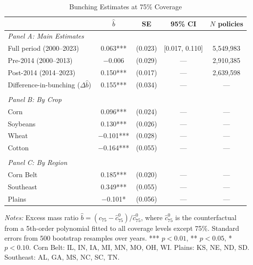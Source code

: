 \begin{table}[htbp]
\centering
\caption{Bunching Estimates at 75\% Coverage}
\label{tab:bunching}
\begin{threeparttable}
\begin{tabular}{lcccc}
\toprule
& $\hat{b}$ & SE & 95\% CI & $N$ policies \\
\midrule
\multicolumn{5}{l}{\textit{Panel A: Main Estimates}} \\[3pt]
Full period (2000--2023) & 0.063*** & (0.023) & [0.017, 0.110] & 5,549,983 \\
Pre-2014 (2000--2013) & $-$0.006 & (0.029) & --- & 2,910,385 \\
Post-2014 (2014--2023) & 0.150*** & (0.017) & --- & 2,639,598 \\
Difference-in-bunching ($\Delta\hat{b}$) & 0.155*** & (0.034) & --- & --- \\
\\
\multicolumn{5}{l}{\textit{Panel B: By Crop}} \\[3pt]
Corn & 0.096*** & (0.024) & --- & --- \\
Soybeans & 0.130*** & (0.026) & --- & --- \\
Wheat & $-$0.101*** & (0.028) & --- & --- \\
Cotton & $-$0.164*** & (0.055) & --- & --- \\
\\
\multicolumn{5}{l}{\textit{Panel C: By Region}} \\[3pt]
Corn Belt & 0.185*** & (0.020) & --- & --- \\
Southeast & 0.349*** & (0.055) & --- & --- \\
Plains & $-$0.101* & (0.056) & --- & --- \\
\bottomrule
\end{tabular}
\begin{tablenotes}[flushleft]
\footnotesize
\item \textit{Notes:} Excess mass ratio $\hat{b} = (c_{75} - \hat{c}_{75}^0) / \hat{c}_{75}^0$, where $\hat{c}_{75}^0$ is the counterfactual from a 5th-order polynomial fitted to all coverage levels except 75\%. Standard errors from 500 bootstrap resamples over years. *** $p<0.01$, ** $p<0.05$, * $p<0.10$. Corn Belt: IL, IN, IA, MI, MN, MO, OH, WI. Plains: KS, NE, ND, SD. Southeast: AL, GA, MS, NC, SC, TN.
\end{tablenotes}
\end{threeparttable}
\end{table}
